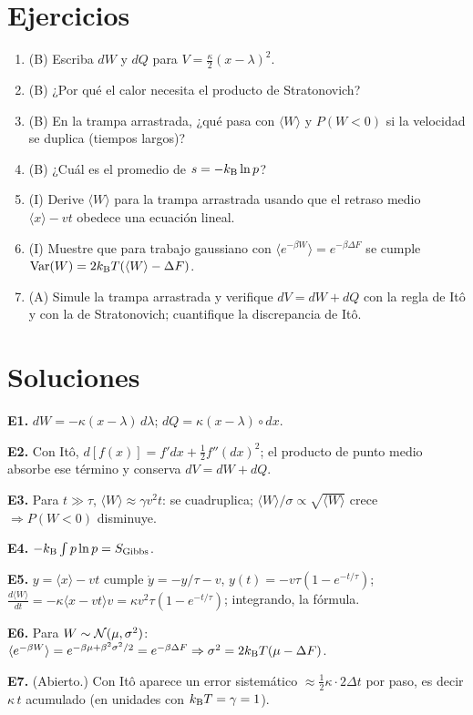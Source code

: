 \documentclass[11pt,a4paper]{article}
\begin{document}
\section{Ejercicios}
\begin{enumerate}[label=\textbf{E\arabic*.}]
\item (B) Escriba $dW$ y $dQ$ para $V=\frac\kappa2(x-\lambda)^2$.
\item (B) ¿Por qué el calor necesita el producto de Stratonovich?
\item (B) En la trampa arrastrada, ¿qué pasa con $\langle W\rangle$ y $P(W<0)$ si la velocidad se duplica (tiempos largos)?
\item (B) ¿Cuál es el promedio de $s=-k_{\mathrm B}\ln p$?
\item (I) Derive $\langle W\rangle$ para la trampa arrastrada usando que el retraso medio $\langle x\rangle-vt$ obedece una ecuación lineal.
\item (I) Muestre que para trabajo gaussiano con $\langle e^{-\beta W}\rangle=e^{-\beta\Delta F}$ se cumple $\operatorname{Var}(W)=2k_{\mathrm B} T(\langle W\rangle-\Delta F)$.
\item (A) Simule la trampa arrastrada y verifique $dV=dW+dQ$ con la regla de Itô y con la de Stratonovich; cuantifique la discrepancia de Itô.
\end{enumerate}
\section{Soluciones}
\begin{solucion}
\textbf{E1.} $dW=-\kappa(x-\lambda)\,d\lambda$; $dQ=\kappa(x-\lambda)\circ dx$.

\textbf{E2.} Con Itô, $d[f(x)]=f'dx+\frac12f''(dx)^2$; el producto de punto medio absorbe ese término y conserva $dV=dW+dQ$.

\textbf{E3.} Para $t\gg\tau$, $\langle W\rangle\approx\gamma v^2t$: se cuadruplica; $\langle W\rangle/\sigma\propto\sqrt{\langle W\rangle}$ crece $\Rightarrow P(W<0)$ disminuye.

\textbf{E4.} $-k_{\mathrm B}\int p\ln p=S_{\text{Gibbs}}$.

\textbf{E5.} $y=\langle x\rangle-vt$ cumple $\dot y=-y/\tau-v$, $y(t)=-v\tau(1-e^{-t/\tau})$; $\frac{d\langle W\rangle}{dt}=-\kappa\langle x-vt\rangle v=\kappa v^2\tau(1-e^{-t/\tau})$; integrando, la fórmula.

\textbf{E6.} Para $W\sim\mathcal{N}(\mu,\sigma^2)$: $\langle e^{-\beta W}\rangle=e^{-\beta\mu+\beta^2\sigma^2/2}=e^{-\beta\Delta F}\Rightarrow\sigma^2=2k_{\mathrm B} T(\mu-\Delta F)$.

\textbf{E7.} (Abierto.) Con Itô aparece un error sistemático $\approx\frac12\kappa\cdot2\Delta t$ por paso, es decir $\kappa\,t$ acumulado (en unidades con $k_{\mathrm B} T=\gamma=1$).
\end{solucion}
\end{document}
